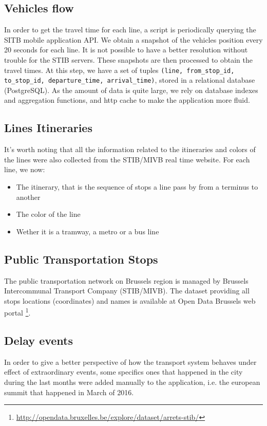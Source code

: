 \documentclass[11pt]{article}%
\begin{document}
\begin{minipage}{0.7\textwidth}
  \subsection{Vehicles flow}
  In order to get the travel time for each line, a script is periodically querying the SITB mobile application API. We obtain a snapshot of the vehicles position every 20 seconds for each line. It is not possible to have a better resolution without trouble for the STIB servers. These snapshots are then processed to obtain the travel times. At this step, we have a set of tuples \texttt{(line, from\_stop\_id, to\_stop\_id, departure\_time, arrival\_time)}, stored in a relational database (PostgreSQL). As the amount of data is quite large, we rely on database indexes and aggregation functions, and http cache to make the application more fluid.

  \subsection{Lines Itineraries}
  It's worth noting that all the information related to the itineraries and colors of the lines were also collected from the STIB/MIVB real time website. For each line, we now:

  \begin{itemize}
      \item The itinerary, that is the sequence of stops a line pass by from a terminus to another
      \item The color of the line
      \item Wether it is a tramway, a metro or a bus line
  \end{itemize}
\end{minipage}

\subsection{Public Transportation Stops}
The public transportation network on Brussels region is managed by Brussels Intercommunal Transport Company (STIB/MIVB). The dataset providing all stops locations (coordinates) and names is available at Open Data Brussels web portal \footnote{\url{http://opendata.bruxelles.be/explore/dataset/arrets-stib/}}.

\subsection{Delay events}
In order to give a better perspective of how the transport system behaves under effect of extraordinary events, some specifics ones that happened in the city during the last months were added manually to the application, i.e. the european summit that happened in March of 2016.
\end{document}
